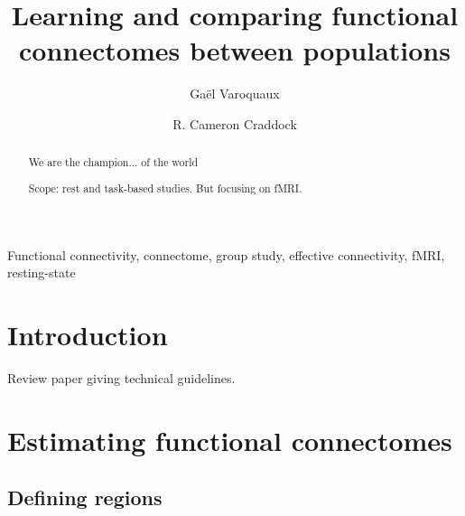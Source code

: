 \documentclass[5p]{elsarticle}
\begin{document}
\title{Learning and comparing functional connectomes between populations}


\author[parietal,unicog,cea]{Ga\"el Varoquaux}
\author[cmi,nki]{R. Cameron Craddock}


\address[parietal]{Parietal project-team, INRIA Saclay-\^ile de France}
\address[unicog]{INSERM, U992}
\address[cea]{CEA/Neurospin b\^at 145, 91191 Gif-Sur-Yvette}
\address[cmi]{Child Mind Institute, New York, New York}
\address[nki]{Nathan Kline Institute for Psychiatric Research, Orangeburg, New York}

\begin{abstract}
    We are the champion... of the world

    Scope: rest and task-based studies. But focusing on fMRI.
\end{abstract}

\begin{keyword}
    Functional connectivity, connectome, group study, effective
    connectivity, fMRI, resting-state
\end{keyword}

\maketitle

\sloppy %
\section{Introduction}

Review paper giving technical guidelines.


\section{Estimating functional connectomes}

\subsection{Defining regions}
\end{document}
